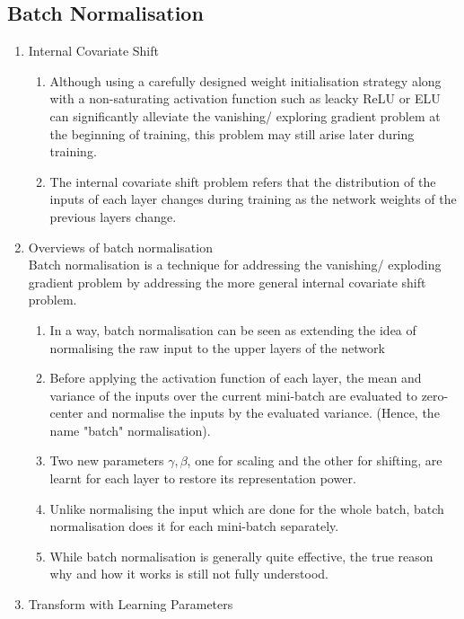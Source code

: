 \documentclass[11pt]{article}
\begin{document}
\subsection{Batch Normalisation}
\begin{enumerate}
    \item Internal Covariate Shift
    \begin{enumerate}
        \item Although using a carefully designed weight initialisation strategy along with a non-saturating activation function such as leacky ReLU or ELU can significantly alleviate the vanishing/ exploring gradient problem at the beginning of training, this problem may still arise later during training.
        \item The internal covariate shift problem refers that the distribution of the inputs of each layer changes during training  as the network weights of the previous layers change.
    \end{enumerate}
    \item Overviews of batch normalisation\\Batch normalisation is a technique for addressing the vanishing/ exploding gradient problem by addressing the more general internal covariate shift problem.
    \begin{enumerate}
        \item In a way, batch normalisation can be seen as extending the idea of normalising the raw input to the upper layers of the network
        \item Before applying the activation function of each layer, the mean and variance of the inputs over the current mini-batch are evaluated to zero-center and normalise the inputs by the evaluated variance. (Hence, the name "batch" normalisation).
        \item Two new parameters $\gamma, \beta$, one for scaling and the other for shifting, are learnt for each layer to restore its representation power.
        \item Unlike normalising the input which are done for the whole batch, batch normalisation does it for each mini-batch separately.
        \item While batch normalisation is generally quite effective, the true reason why and how it works is still not fully understood.
    \end{enumerate}
    \item Transform with Learning Parameters
    \begin{enumerate}

\end{enumerate}
\end{enumerate}
\end{document}

